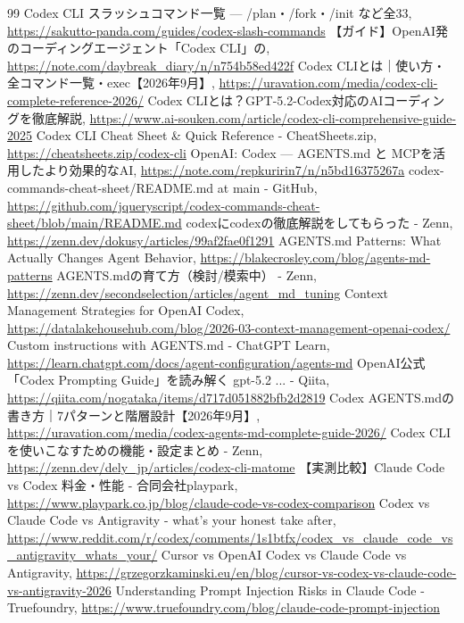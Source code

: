 \documentclass[a4paper,11pt]{ltjsarticle}
\begin{document}
\begin{thebibliography}{99}
 Codex CLI スラッシュコマンド一覧 --- /plan・/fork・/init など全33, \url{https://sakutto-panda.com/guides/codex-slash-commands}
 【ガイド】OpenAI発のコーディングエージェント「Codex CLI」の, \url{https://note.com/daybreak_diary/n/n754b58ed422f}
 Codex CLIとは｜使い方・全コマンド一覧・exec【2026年9月】, \url{https://uravation.com/media/codex-cli-complete-reference-2026/}
 Codex CLIとは？GPT-5.2-Codex対応のAIコーディングを徹底解説, \url{https://www.ai-souken.com/article/codex-cli-comprehensive-guide-2025}
 Codex CLI Cheat Sheet \& Quick Reference - CheatSheets.zip, \url{https://cheatsheets.zip/codex-cli}
 OpenAI: Codex --- AGENTS.md と MCPを活用したより効果的なAI, \url{https://note.com/repkuririn7/n/n5bd16375267a}
 codex-commands-cheat-sheet/README.md at main - GitHub, \url{https://github.com/jqueryscript/codex-commands-cheat-sheet/blob/main/README.md}
 codexにcodexの徹底解説をしてもらった - Zenn, \url{https://zenn.dev/dokusy/articles/99af2fae0f1291}
 AGENTS.md Patterns: What Actually Changes Agent Behavior, \url{https://blakecrosley.com/blog/agents-md-patterns}
 AGENTS.mdの育て方（検討/模索中） - Zenn, \url{https://zenn.dev/secondselection/articles/agent_md_tuning}
 Context Management Strategies for OpenAI Codex, \url{https://datalakehousehub.com/blog/2026-03-context-management-openai-codex/}
 Custom instructions with AGENTS.md - ChatGPT Learn, \url{https://learn.chatgpt.com/docs/agent-configuration/agents-md}
 OpenAI公式「Codex Prompting Guide」を読み解く gpt-5.2 ... - Qiita, \url{https://qiita.com/nogataka/items/d717d051882bfb2d2819}
 Codex AGENTS.mdの書き方｜7パターンと階層設計【2026年9月】, \url{https://uravation.com/media/codex-agents-md-complete-guide-2026/}
 Codex CLIを使いこなすための機能・設定まとめ - Zenn, \url{https://zenn.dev/dely_jp/articles/codex-cli-matome}
 【実測比較】Claude Code vs Codex 料金・性能 - 合同会社playpark, \url{https://www.playpark.co.jp/blog/claude-code-vs-codex-comparison}
 Codex vs Claude Code vs Antigravity - what's your honest take after, \url{https://www.reddit.com/r/codex/comments/1s1btfx/codex_vs_claude_code_vs_antigravity_whats_your/}
 Cursor vs OpenAI Codex vs Claude Code vs Antigravity, \url{https://grzegorzkaminski.eu/en/blog/cursor-vs-codex-vs-claude-code-vs-antigravity-2026}
 Understanding Prompt Injection Risks in Claude Code - Truefoundry, \url{https://www.truefoundry.com/blog/claude-code-prompt-injection}

\end{thebibliography}
\end{document}
